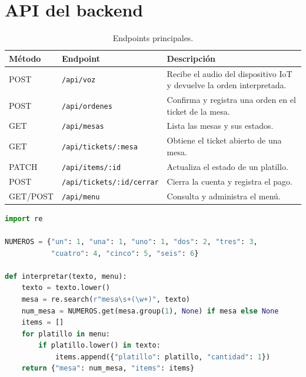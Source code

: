 \documentclass[11pt,letterpaper]{article}
\newcommand{\tabhead}[1]{\textbf{\color{white}#1}}
\newcommand{\encabezado}{\rowcolor{azulprincipal}}
\begin{document}
\section{API del backend}
\begin{table}[h!]
\centering
\begin{tabularx}{\textwidth}{l l X}
\toprule
\encabezado \tabhead{Método} & \tabhead{Endpoint} & \tabhead{Descripción} \\
\midrule
POST & \texttt{/api/voz} & Recibe el audio del dispositivo IoT y devuelve la orden interpretada. \\
POST & \texttt{/api/ordenes} & Confirma y registra una orden en el ticket de la mesa. \\
GET & \texttt{/api/mesas} & Lista las mesas y sus estados. \\
GET & \texttt{/api/tickets/:mesa} & Obtiene el ticket abierto de una mesa. \\
PATCH & \texttt{/api/items/:id} & Actualiza el estado de un platillo. \\
POST & \texttt{/api/tickets/:id/cerrar} & Cierra la cuenta y registra el pago. \\
GET/POST & \texttt{/api/menu} & Consulta y administra el menú. \\
\bottomrule
\end{tabularx}
\caption{Endpoints principales.}
\end{table}

\begin{lstlisting}[language=Python, caption={Ejemplo simplificado del parser de órdenes (Python).}]
import re

NUMEROS = {"un": 1, "una": 1, "uno": 1, "dos": 2, "tres": 3,
           "cuatro": 4, "cinco": 5, "seis": 6}

def interpretar(texto, menu):
    texto = texto.lower()
    mesa = re.search(r"mesa\s+(\w+)", texto)
    num_mesa = NUMEROS.get(mesa.group(1), None) if mesa else None
    items = []
    for platillo in menu:
        if platillo.lower() in texto:
            items.append({"platillo": platillo, "cantidad": 1})
    return {"mesa": num_mesa, "items": items}
\end{lstlisting}

\end{document}
